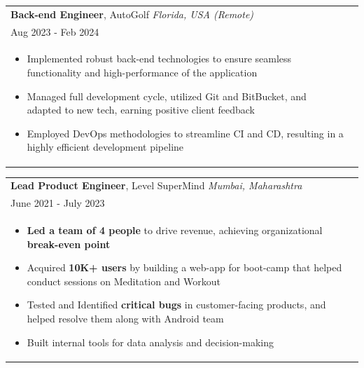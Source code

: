 \documentclass[a4paper,8pt]{article}
\begin{document}
\begin{tabularx}{\linewidth}{ @{}l r@{} }
\large\textbf{Back-end Engineer}, AutoGolf \hfill \color[HTML]{4B28A4} \normalsize\textit{Florida, USA (Remote)} \\[4pt]
\large{Aug 2023 - Feb 2024} \hfill \\[4pt]
\begin{minipage}[t]{\linewidth}
    \begin{itemize}[nosep,after=\strut, leftmargin=2em, itemsep=2pt]
        \item Implemented robust back-end technologies to ensure seamless functionality and high-performance of the application
        \item Managed full development cycle, utilized Git and BitBucket, and adapted to new tech, earning positive client feedback
        \item Employed DevOps methodologies to streamline CI and CD, resulting in a highly efficient development pipeline
    \end{itemize}
\end{minipage}
\end{tabularx}

\begin{tabularx}{\linewidth}{ @{}l r@{} }
\large\textbf{Lead Product Engineer}, Level SuperMind \hfill \color[HTML]{4B28A4}  \normalsize\textit{Mumbai, Maharashtra} \\[4pt]
\large{June 2021 - July 2023} \hfill \\[5pt]
\begin{minipage}[t]{\linewidth}
    \begin{itemize}[nosep,after=\strut, leftmargin=2em, itemsep=2pt]
        \item \textbf{Led a team of 4 people} to drive revenue, achieving organizational \textbf{break-even point}
        \item Acquired \textbf{10K+ users} by building a web-app for boot-camp that helped conduct sessions on Meditation and Workout
        \item Tested and Identified \textbf{critical bugs} in customer-facing products, and helped resolve them along with Android team
        \item Built internal tools for data analysis and decision-making
    \end{itemize}
\end{minipage}
\end{tabularx}
\end{document}
